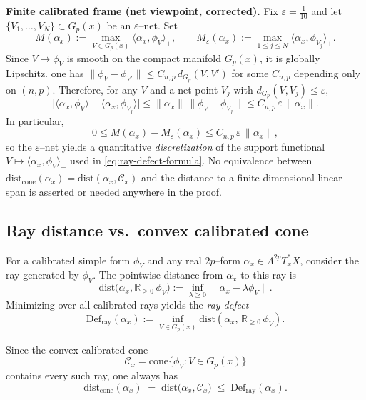 \documentclass[11pt]{article}
\numberwithin{equation}{section}  %
\theoremstyle{plain}
\theoremstyle{definition}
\theoremstyle{remark}
\newcommand{\R}{\mathbb{R}}
\newcommand{\dist}{\mathrm{dist}}
\newcommand{\Def}{\mathrm{Def}}
\newcommand{\cone}{\mathrm{cone}}
\newcommand{\distcone}{\dist_{\cone}}        %
\newcommand{\Gp}{G_p}
\begin{document}
\noindent\textbf{Finite calibrated frame (net viewpoint, corrected).}
Fix $\varepsilon=\tfrac{1}{10}$ and let $\{V_{1},\ldots,V_{N}\}\subset \Gp(x)$ be an $\varepsilon$--net.
Set
\[
M(\alpha_{x}) := \max_{V\in \Gp(x)} \langle \alpha_{x},\phi_{V}\rangle_{+},
\qquad
M_{\varepsilon}(\alpha_{x}) := \max_{1\le j\le N}\langle \alpha_{x},\phi_{V_{j}}\rangle_{+}.
\]
Since $V\mapsto \phi_{V}$ is smooth on the compact manifold $\Gp(x)$, it is globally Lipschitz.
one has $\|\phi_{V}-\phi_{V'}\|\le C_{n,p}\,d_{\Gp}(V,V')$ for some $C_{n,p}$ depending only on $(n,p)$.
Therefore, for any $V$ and a net point $V_{j}$ with $d_{\Gp}(V,V_{j})\le \varepsilon$,
\[
\bigl|\langle \alpha_{x},\phi_{V}\rangle - \langle \alpha_{x},\phi_{V_{j}}\rangle\bigr|
\le \|\alpha_{x}\|\,\|\phi_{V}-\phi_{V_{j}}\|
\le C_{n,p}\,\varepsilon\,\|\alpha_{x}\|.
\]
In particular,
\[
0\le M(\alpha_{x})-M_{\varepsilon}(\alpha_{x})\le C_{n,p}\,\varepsilon\,\|\alpha_{x}\|,
\]
so the $\varepsilon$--net yields a quantitative \emph{discretization} of the support functional
$V\mapsto \langle \alpha_{x},\phi_{V}\rangle_{+}$ used in \eqref{eq:ray-defect-formula}.
No equivalence between $\distcone(\alpha_{x})=\dist(\alpha_{x},\mathcal{C}_{x})$ and the distance to a finite-dimensional
linear span is asserted or needed anywhere in the proof.



\subsection*{Ray distance vs.\ convex calibrated cone}

For a calibrated simple form $\phi_{V}$ and any real $2p$--form 
$\alpha_{x}\in \Lambda^{2p}T^{*}_{x}X$, consider the ray generated by $\phi_{V}$.
The pointwise distance from $\alpha_{x}$ to this ray is
\[
\dist\bigl(\alpha_{x}, \R_{\ge 0}\,\phi_{V}\bigr)
:=
\inf_{\lambda\ge 0} \|\alpha_{x}-\lambda\phi_{V}\|.
\]
Minimizing over all calibrated rays yields the \emph{ray defect}
\[
\Def_{\mathrm{ray}}(\alpha_{x})
:=
\inf_{V\in \Gp(x)}
\dist\!\left(
\alpha_{x},\,
\R_{\ge 0}\,\phi_{V}
\right).
\]

Since the convex calibrated cone
\[
\mathcal{C}_{x} = \cone\{\phi_{V} : V\in \Gp(x)\}
\]
contains every such ray, one always has
\[
\distcone(\alpha_{x})
\;=\;
\dist\bigl(\alpha_{x},\mathcal{C}_{x}\bigr)
\;\le\;
\Def_{\mathrm{ray}}(\alpha_{x}).
\]
\end{document}
